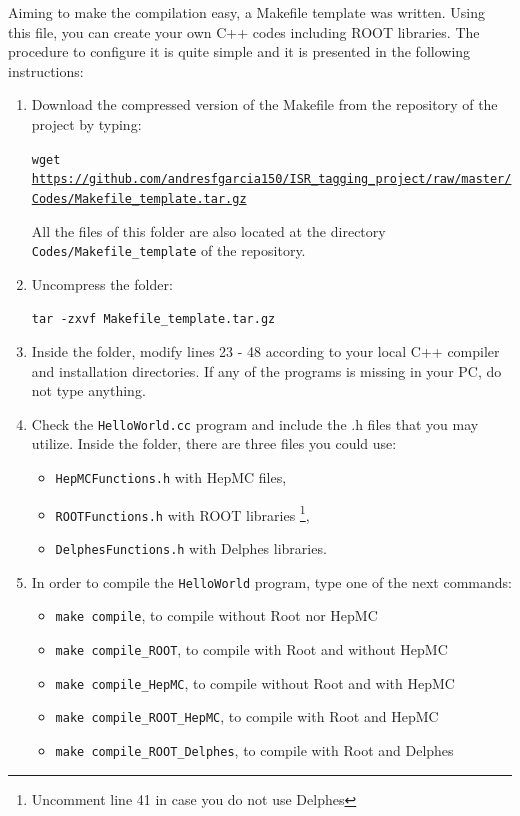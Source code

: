 \documentclass[12pt, oneside]{book}              %
\begin{document}
Aiming to make the compilation easy, a Makefile template was written.
Using this file, you can create your own C++ codes including ROOT 
libraries. The procedure to configure it is quite simple and it is
presented in the following instructions:

\begin{enumerate}
\item Download the compressed version of the Makefile from the repository
of the project by typing:

\texttt{wget \url{https://github.com/andresfgarcia150/ISR_tagging_project/raw/master/Codes/Makefile_template.tar.gz}}

All the files of this folder are also located at the directory
\texttt{Codes/Makefile\_template} of the repository.

\item Uncompress the folder:

\texttt{tar -zxvf Makefile\_template.tar.gz}

\item Inside the folder, modify lines 23 - 48 according to your local C++
compiler and installation directories. If any of the programs is missing 
in your PC, do not type anything.

\item Check the \texttt{HelloWorld.cc} program and include the .h files
that you may utilize. Inside the folder, there are three files you could use:

\begin{itemize}
\item \texttt{HepMCFunctions.h} with HepMC files,
\item \texttt{ROOTFunctions.h} with ROOT libraries \footnote{Uncomment line
 41 in case you do not use Delphes},
\item \texttt{DelphesFunctions.h} with Delphes libraries.
\end{itemize}

\item In order to compile the \texttt{HelloWorld} program, type one of 
the next commands:

\begin{itemize}
\item \texttt{make compile},                    to compile without Root nor HepMC
\item \texttt{make compile\_ROOT},              to compile with Root and without HepMC
\item \texttt{make compile\_HepMC},             to compile without Root and with HepMC
\item \texttt{make compile\_ROOT\_HepMC},       to compile with Root and HepMC
\item \texttt{make compile\_ROOT\_Delphes},     to compile with Root and Delphes
\end{itemize}

\end{enumerate}
\end{document}
